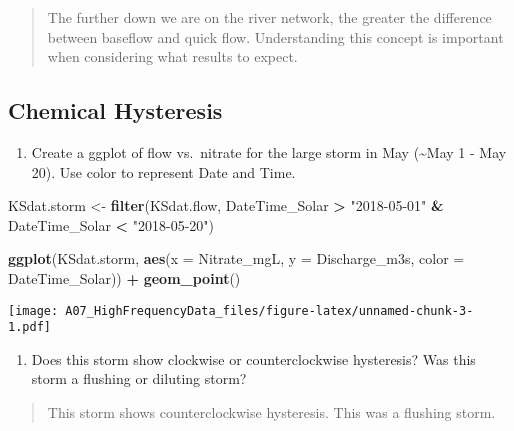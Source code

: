 \documentclass[]{article}
\newenvironment{Shaded}{\begin{snugshade}}{\end{snugshade}}
\newcommand{\DataTypeTok}[1]{\textcolor[rgb]{0.13,0.29,0.53}{#1}}
\newcommand{\KeywordTok}[1]{\textcolor[rgb]{0.13,0.29,0.53}{\textbf{#1}}}
\newcommand{\NormalTok}[1]{#1}
\newcommand{\OperatorTok}[1]{\textcolor[rgb]{0.81,0.36,0.00}{\textbf{#1}}}
\newcommand{\StringTok}[1]{\textcolor[rgb]{0.31,0.60,0.02}{#1}}
\providecommand{\tightlist}{%
  \setlength{\itemsep}{0pt}\setlength{\parskip}{0pt}}
\begin{document}
\begin{quote}
The further down we are on the river network, the greater the difference
between baseflow and quick flow. Understanding this concept is important
when considering what results to expect.
\end{quote}

\hypertarget{chemical-hysteresis}{%
\subsection{Chemical Hysteresis}\label{chemical-hysteresis}}

\begin{enumerate}
\def\labelenumi{\arabic{enumi}.}
\setcounter{enumi}{13}
\tightlist
\item
  Create a ggplot of flow vs.~nitrate for the large storm in May
  (\textasciitilde{}May 1 - May 20). Use color to represent Date and
  Time.
\end{enumerate}

\begin{Shaded}
\begin{Highlighting}[]
\NormalTok{KSdat.storm <-}\StringTok{ }\KeywordTok{filter}\NormalTok{(KSdat.flow,}
\NormalTok{  DateTime_Solar }\OperatorTok{>}\StringTok{ "2018-05-01"} \OperatorTok{&}\StringTok{ }\NormalTok{DateTime_Solar }\OperatorTok{<}\StringTok{ "2018-05-20"}\NormalTok{)}

\KeywordTok{ggplot}\NormalTok{(KSdat.storm, }\KeywordTok{aes}\NormalTok{(}\DataTypeTok{x =}\NormalTok{ Nitrate_mgL, }\DataTypeTok{y =}\NormalTok{ Discharge_m3s,}
  \DataTypeTok{color =}\NormalTok{ DateTime_Solar)) }\OperatorTok{+}\StringTok{ }
\StringTok{  }\KeywordTok{geom_point}\NormalTok{() }
\end{Highlighting}
\end{Shaded}

\texttt{[image: A07\_HighFrequencyData\_files/figure-latex/unnamed-chunk-3-1.pdf]}

\begin{enumerate}
\def\labelenumi{\arabic{enumi}.}
\setcounter{enumi}{14}
\tightlist
\item
  Does this storm show clockwise or counterclockwise hysteresis? Was
  this storm a flushing or diluting storm?
\end{enumerate}

\begin{quote}
This storm shows counterclockwise hysteresis. This was a flushing storm.
\end{quote}
\end{document}
